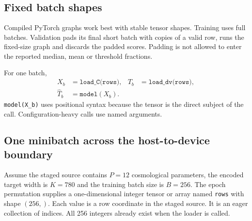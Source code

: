 \documentclass[10pt,aps,prd,twocolumn,nofootinbib]{revtex4-2}
\newcommand{\code}[1]{\texttt{#1}}
\begin{document}
\subsection{Fixed batch shapes}

Compiled PyTorch graphs work best with stable tensor shapes.  Training uses
full batches.  Validation pads its final short batch with copies of a valid
row, runs the fixed-size graph and discards the padded scores.  Padding is not
allowed to enter the reported median, mean or threshold fractions.

For one batch,
\begin{equation*}
\begin{aligned}
  X_b&=\code{load\_C(rows)},&
  T_b&=\code{load\_dv(rows)},\\
  \widehat T_b&=\code{model}(X_b).&&
\end{aligned}
\end{equation*}
\code{model(X\_b)} uses positional syntax because the tensor is the direct
subject of the call.  Configuration-heavy calls use named arguments.

\subsection{One minibatch across the host-to-device boundary}

Assume the staged source contains $P=12$ cosmological parameters, the encoded
target width is $K=780$ and the training batch size is $B=256$.  The epoch
permutation supplies a one-dimensional integer tensor or array named
\code{rows} with shape $(256,)$.  Each value is a row coordinate in the
staged source.  It is an eager collection of indices.  All 256 integers
already exist when the loader is called.
\end{document}
